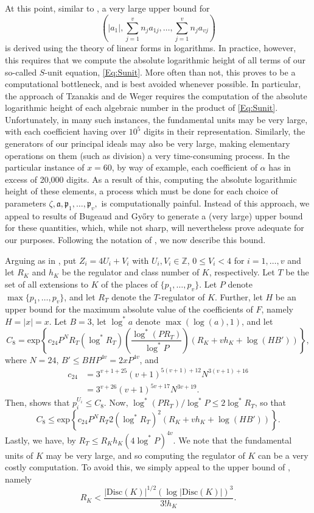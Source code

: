 At this point, similar to \cite{TW3}, a very large upper bound for 
\[\left(|a_1|, \sum_{j = 1}^v n_ja_{1j}, \dots, \sum_{j = 1}^v n_ja_{vj}\right)\]
is derived using the theory of linear forms in logarithms. In practice, however, this requires that we compute the absolute logarithmic height of all terms of our so-called $S$-unit equation, \eqref{Eq:Sunit}. More often than not, this proves to be a computational bottleneck, and is best avoided whenever possible. In particular, the approach of Tzanakis and de Weger \cite{TW3}  requires the computation of the absolute logarithmic height of each algebraic number in the product of \eqref{Eq:Sunit}. Unfortunately, in many such instances, the fundamental units may be very large, with each coefficient having over $10^5$ digits in their representation. Similarly, the generators of our principal ideals may also be very large, making elementary operations on them (such as division) a very time-consuming process. In the particular instance of $x = 60$, by way of example, each coefficient of $\alpha$ has in excess of 20,000 digits. As a result of this, computing the absolute logarithmic height of these elements, a process which must be done for each choice of parameters $\zeta, \mathfrak{a}, \mathfrak{p}_1, \dots, \mathfrak{p}_v,$ is  computationally painful. Instead of this approach, we appeal to results of Bugeaud and Gy\H{o}ry  \cite{BugeaudGyory} to generate a (very large) upper bound for these quantities, which, while not sharp, will nevertheless prove adequate for our purposes. Following the notation of \cite{BugeaudGyory}, we now describe this bound.  

Arguing as in \cite{BugeaudGyory}, put $Z_i = 4U_i + V_i$ with $U_i, V_i \in \mathbb{Z}$, $0 \leq V_i < 4$ for $i = 1, \dots, v$ and let $R_K$ and $h_K$ be the regulator and class number of $K$, respectively. Let $T$ be the set of all extensions to $K$ of the places of $\{p_1, \dots, p_v\}$. Let $P$ denote $\max\{p_1, \dots, p_v\}$, and let $R_T$ denote the $T$-regulator of $K$. Further, let $H$ be an upper bound for the maximum absolute value of the coefficients of $F$, namely $H = |x| = x$. Let $B = 3$, let $\log^*{a}$ denote $\max(\log(a), 1)$, and let
\[C_8 = \text{exp}\left\{c_{24}P^N R_T (\log^*R_T)\left(\frac{\log^*(PR_T)}{\log^*P}\right)(R_{K} + vh_{K} + \log(HB'))\right\},\]
where $N = 24$, $B' \leq BHP^{4v} = 2xP^{4v}$, and 
\[\begin{array}{cc}
c_{24}  & = 3^{v+1 +25}(v+1)^{5(v+1) +12} N^{3(v+1)+16} \\
	& = 3^{v + 26}(v+1)^{5v+17}N^{3v + 19}.
\end{array}\]
Then, \cite{BugeaudGyory} shows that $p_i^{U_i} \leq C_8$. Now, ${\log^*(PR_T)/\log^*P \leq 2\log^*R_T}$, so that 
\[C_8 \leq \text{exp}\left\{c_{24}P^N R_T 2(\log^*R_T)^2(R_{K} + vh_{K} + \log(HB'))\right\}.\] 
Lastly, we have, by \cite{BugeaudGyory} $R_T \leq R_Kh_K(4\log^*P)^{4v}$. We note that the fundamental units of $K$ may be very large, and so computing the regulator of $K$ can be a very costly computation. To avoid this, we simply appeal to the upper bound of \cite{BugeaudGyory}, namely
\[R_K < \frac{|\text{Disc}(K)|^{1/2}(\log|\text{Disc}(K)|)^{3}}{3!h_K}.\]

